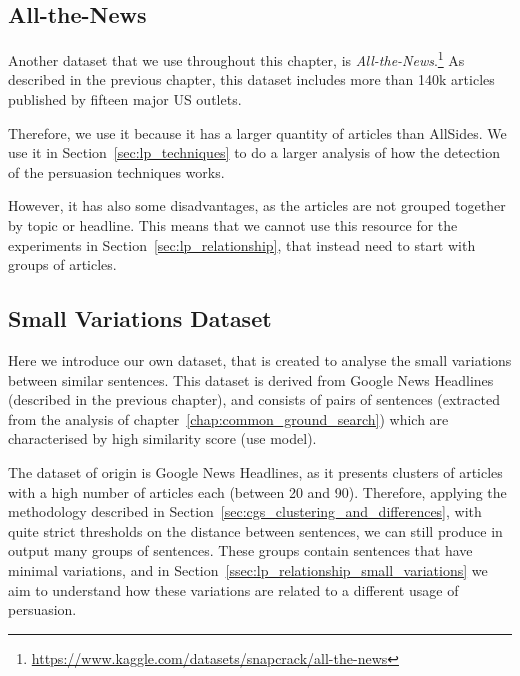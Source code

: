\subsection{All-the-News}

Another dataset that we use throughout this chapter, is \emph{All-the-News}.\footnote{\url{https://www.kaggle.com/datasets/snapcrack/all-the-news}}
As described in the previous chapter, this dataset includes more than 140k articles published by fifteen major US outlets.

Therefore, we use it because it has a larger quantity of articles than AllSides. We use it in Section~\ref{sec:lp_techniques} to do a larger analysis of how the detection of the persuasion techniques works.

However, it has also some disadvantages, as the articles are not grouped together by topic or headline.
This means that we cannot use this resource for the experiments in Section~\ref{sec:lp_relationship}, that instead need to start with groups of articles.

\subsection{Small Variations Dataset}
\label{ssec:lp_relationship_small_variations_data}

Here we introduce our own dataset, that is created to analyse the small variations between similar sentences.
This dataset is derived from Google News Headlines (described in the previous chapter), and consists of pairs of sentences (extracted from the analysis of chapter~\ref{chap:common_ground_search}) which are characterised by high similarity score (\acrshort{use} model).

The dataset of origin is Google News Headlines, as it presents clusters of articles with a high number of articles each (between 20 and 90). Therefore, applying the methodology described in Section~\ref{sec:cgs_clustering_and_differences}, with quite strict thresholds on the distance between sentences, we can still produce in output many groups of sentences. These groups contain sentences that have minimal variations, and in Section~\ref{ssec:lp_relationship_small_variations} we aim to understand how these variations are related to a different usage of persuasion.

